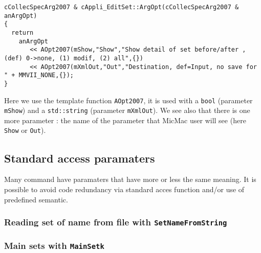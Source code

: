 {\small
\begin{verbatim}
cCollecSpecArg2007 & cAppli_EditSet::ArgOpt(cCollecSpecArg2007 & anArgOpt)
{
  return
    anArgOpt
       << AOpt2007(mShow,"Show","Show detail of set before/after , (def) 0->none, (1) modif, (2) all",{})
       << AOpt2007(mXmlOut,"Out","Destination, def=Input, no save for " + MMVII_NONE,{});
}
\end{verbatim}
}

Here we use the template function {\tt AOpt2007},
it is used with a {\tt bool} (parameter {\tt mShow})
and a {\tt std::string} (parameter {\tt mXmlOut}).
We see also that there is one more parameter : the name of the 
parameter that MicMac user will see (here {\tt Show} or {\tt Out}).


\subsection{Standard access paramaters}

Many command have paramaters that have more or less the
same meaning. It is possible to avoid code redundancy
via standard acces function and/or use of predefined semantic.

\subsubsection{Reading set of name from file with {\tt  SetNameFromString}}
\subsubsection{Main sets with {\tt MainSetk}}




